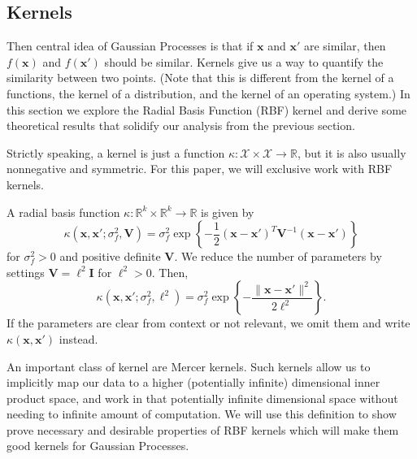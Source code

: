 \subsection{Kernels}

Then central idea of Gaussian Processes is that if $\mathbf{x}$ and $\mathbf{x}'$ are similar,
then $f(\mathbf{x})$ and $f(\mathbf{x}')$ should be similar.
Kernels give us a way to quantify the similarity between two points.
(Note that this is different from the kernel of a functions, the kernel of a distribution, and the kernel of an operating system.)
In this section we explore the Radial Basis Function (RBF) kernel and derive some theoretical results that solidify our analysis from the previous section.

Strictly speaking, a kernel is just a function $\kappa: \mathcal{X} \times \mathcal{X} \to \mathbb{R}$,
but it is also usually nonnegative and symmetric.
For this paper, we will exclusive work with RBF kernels.

\begin{definition}
    A radial basis function $\kappa: \mathbb{R}^{k} \times \mathbb{R}^{k} \to \mathbb{R}$
    is given by
    \begin{equation*}
        \kappa(\mathbf{x}, \mathbf{x}'; \sigma_f^2, \mathbf{V})
        = \sigma_f^{2} \exp \left\{ -\frac12 (\mathbf{x} - \mathbf{x}')^{T} \mathbf{V}^{-1} (\mathbf{x} - \mathbf{x}') \right\}
    \end{equation*}
    for $\sigma_f^2 > 0$ and positive definite $\mathbf{V}$.
    We reduce the number of parameters by settings $\mathbf{V} = \ell^2\mathbf{I}$ for $\ell^2 > 0$.
    Then,
    \begin{equation*}
        \kappa(\mathbf{x}, \mathbf{x}'; \sigma_f^2, \ell^2)
        = \sigma_f^{2} \exp \left\{ - \frac{ \lVert \mathbf{x} - \mathbf{x}' \rVert^2 }{ 2 \ell^2 }\right\}.
    \end{equation*}
    If the parameters are clear from context or not relevant, we omit them and write $\kappa(\mathbf{x}, \mathbf{x}')$ instead.
\end{definition}

An important class of kernel are Mercer kernels.
Such kernels allow us to implicitly map our data to a higher (potentially infinite) dimensional inner product space, and work in that potentially infinite dimensional space without needing to infinite amount of computation.
We will use this definition to show prove necessary and desirable properties of RBF kernels which will make them good kernels for Gaussian Processes.

